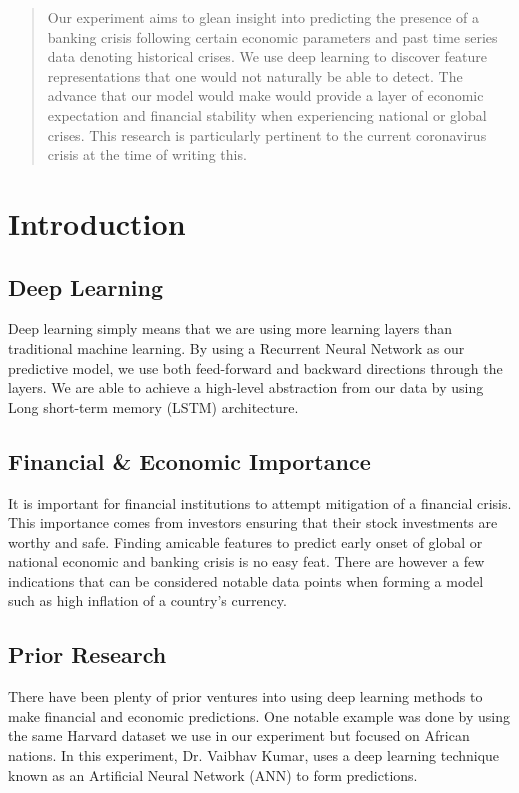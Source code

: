 \documentclass[12pt]{article}
\begin{document}
\maketitle

\begin{abstract}
Our experiment aims to glean insight into predicting the presence of a banking crisis following certain economic parameters and past time series data denoting historical crises. We use deep learning to discover feature representations that one would not naturally be able to detect. The advance that our model would make would provide a layer of economic expectation and financial stability when experiencing national or global crises. This research is particularly pertinent to the current coronavirus crisis at the time of writing this.
\end{abstract}


\section{Introduction}

\subsection{Deep Learning}
Deep learning simply means that we are using more learning layers than traditional machine learning. By using a Recurrent Neural Network as our predictive model, we use both feed-forward and backward directions through the layers. We are able to achieve a high-level abstraction from our data by using Long short-term memory (LSTM) architecture\cite{kumar}.

\subsection{Financial \& Economic Importance}
It is important for financial institutions to attempt mitigation of a financial crisis.  This importance comes from investors ensuring that their stock investments are worthy and safe. Finding amicable features to predict early onset of global or national economic and banking crisis is no easy feat. There are however a few indications that can be considered notable data points when forming a model such as high inflation of a country's currency\cite{kumar}. 

\subsection{Prior Research}
There have been plenty of prior ventures into using deep learning methods to make financial and economic predictions. One notable example was done by using the same Harvard dataset we use in our experiment but focused on African nations\cite{kumar}. In this experiment, Dr. Vaibhav Kumar, uses a deep learning technique known as an Artificial Neural Network (ANN) to form predictions\cite{kumar}. 
\end{document}
